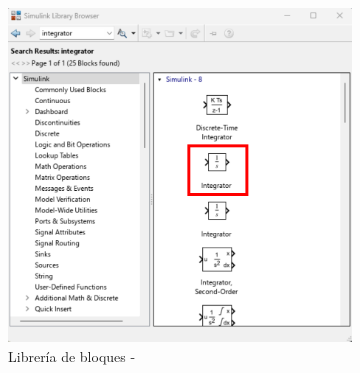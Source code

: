 \begin{figure}[htbp]
    \centering
    \begin{subfigure}[b]{0.35\textwidth}
        \centering
        \includegraphics[width=\textwidth]{fig/Capitulo5/Caso_de_estudio_PID/lib_integrator.pdf}
        \caption{Librería de bloques -}
        \label{fig:bias_sim}
    \end{subfigure}
    \hfill
    \begin{subfigure}[b]{0.45\textwidth}
        \centering

\end{subfigure}
\end{figure}

